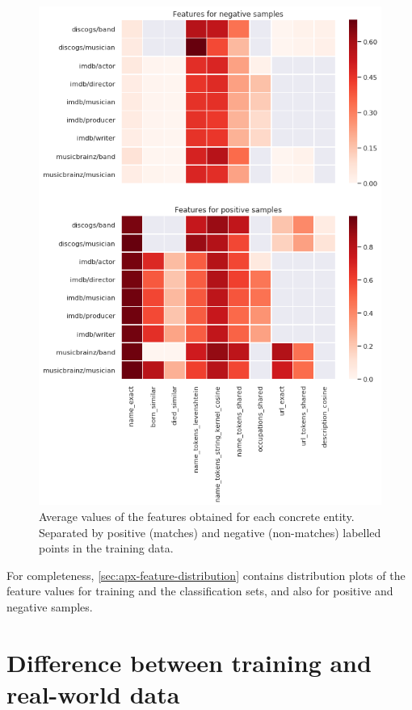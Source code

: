 \documentclass[epsfig,a4paper,11pt,titlepage,twoside,openany]{book}
\begin{document}
\begin{figure}[h]
  \centering \includegraphics[width=.8\textwidth]{feature_heatmap_training_positive_and_negative} 
  \caption{Average values of the features obtained for each concrete entity. Separated by positive (matches) and negative (non-matches) labelled points in the training data.}
  \label{fig:average-features-positive-negative}
\end{figure}


For completeness, \autoref{sec:apx-feature-distribution} contains distribution plots of the feature values for training and the classification sets, and also for positive and negative samples. 






\section{Difference between training and real-world data}
\label{sec:training-real-data-difference}
\end{document}
